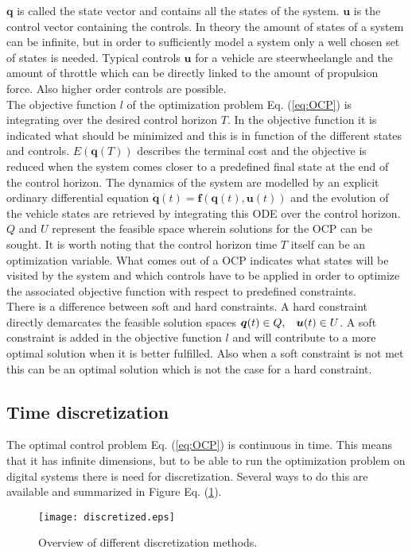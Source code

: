 $\bm{q}$ is called the state vector and contains all the states of the system. $\bm{u}$ is the control vector containing the controls. In theory the amount of states of a system can be infinite, but in order to sufficiently model a system only a well chosen set of states is needed. Typical controls $\bm{u}$ for a vehicle are steerwheelangle and the amount of throttle which can be directly linked to the amount of propulsion force. Also higher order controls are possible.\\
The objective function $l$ of the optimization problem Eq. (\ref{eq:OCP}) is integrating over the desired control horizon $T$. In the objective function it is indicated what should be minimized and this is in function of the different states and controls. $E(\bm{q}(T))$ describes the terminal cost and the objective is reduced when the system comes closer to a predefined final state at the end of the control horizon.
The dynamics of the system are modelled by an explicit ordinary differential equation $\bm{\dot{q}}(t) = \bm{f}(\bm{q}(t), \bm{u}(t))$ and the evolution of the vehicle states are retrieved by integrating this ODE over the control horizon.
$Q$ and $U$ represent the feasible space wherein solutions for the OCP can be sought. It is worth noting that the control horizon time $T$ itself can be an optimization variable. What comes out of a OCP indicates what states will be visited by the system and which controls have to be applied in order to optimize the associated objective function with respect to predefined constraints. \cite{Panos_opti}\\ 

There is a difference between soft and hard constraints. A hard constraint directly demarcates the feasible solution spaces $\bm{q}(t)\in Q,\hspace{3 mm} \bm{u}(t)\in U$. A soft constraint is added in the objective function $l$ and will contribute to a more optimal solution when it is better fulfilled. Also when a soft constraint is not met this can be an optimal solution which is not the case for a hard constraint. \cite{Yankov} \\

\subsection{Time discretization}
\label{s:time_dis}
The optimal control problem Eq. (\ref{eq:OCP}) is continuous in time. This means that it has infinite dimensions, but to be able to run the optimization problem on digital systems there is need for discretization. Several ways to do this are available and summarized in Figure Eq. (\ref{fig:discretization_m}).\cite{Gillis2019}
\begin{figure}[htp]
	\centering
	\texttt{[image: discretized.eps]}
	\caption{Overview of different discretization methods.}
	\label{fig:discretization_m}
\end{figure}

